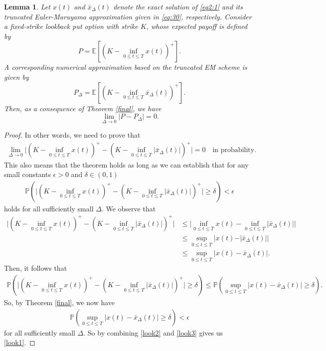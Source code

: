 \documentclass[11pt]{article}
\newtheorem{lemma}[definition]{Lemma}
\begin{document}
\begin{lemma}
Let $x(t)$ and $\bar{x}_{\Delta}(t)$ denote the exact solution of \eqref{eq2:1} and its truncated Euler-Maruyama approximation given in \eqref{eq:30}, respectively. Consider a fixed-strike lookback put option with strike $K$, whose expected payoff is defined by
\begin{equation}\label{eq:52**}
P = \mathbb{E}\left[\left(K - \inf_{0 \le t \le T} x(t)\right)^+\right].
\end{equation}
A corresponding numerical approximation based on the truncated EM scheme is given by
\begin{equation}\label{eq:52***}
P_{\Delta} = \mathbb{E}\left[\left(K - \inf_{0 \le t \le T} \bar{x}_{\Delta}(t)\right)^+\right].
\end{equation}
Then, as a consequence of Theorem \ref{final}, we have
\begin{equation*}
\lim_{\Delta \to 0} |P - P_{\Delta}| = 0.
\end{equation*}
\end{lemma}

\begin{proof}
In other words, we need to prove that
\begin{align*}
\lim_{\Delta\rightarrow 0}\vert  (K-\inf_{0\le t\le T}x(t))^+-(K-\inf_{0\le t\le T}\vert \bar{x}_{\Delta}(t)\vert)^+\vert=0\quad \text{in probability}.
\end{align*}
This also means that the theorem holds as long as we can establish that for any small constants $\epsilon>0$ and $\delta\in (0,1)$
\begin{align}\label{look1}
\mathbb{P}(\vert (K-\inf_{0\le t\le T}x(t))^+-(K-\inf_{0\le t\le T}\vert \bar{x}_{\Delta}(t)\vert)^+\vert\ge \delta)<\epsilon
\end{align}
holds for all sufficiently small $\Delta$. We observe that
\begin{align}
\vert  (K-\inf_{0\le t\le T}x(t))^+-(K-\inf_{0\le t\le T}\vert \bar{x}_{\Delta}(t)\vert)^+\vert
&\le \vert \inf_{0\le t\le T}x(t)-\inf_{0\le t\le T}\vert \bar{x}_{\Delta}(t)\vert\vert\nonumber\\
&\le \sup_{0\le t\le T}\vert x(t)-\vert \bar{x}_{\Delta}(t)\vert\vert\nonumber\\
&\le \sup_{0\le t\le T}\vert x(t)-\bar{x}_{\Delta}(t)\vert.
\end{align}
Then, it follows that 
\begin{align}\label{look2}
\mathbb{P}(\vert (K-\inf_{0\le t\le T}x(t))^+-(K-\inf_{0\le t\le T}\vert \bar{x}_{\Delta}(t)\vert)^+\vert\ge \delta)
\le \mathbb{P}(\sup_{0\le t\le T}\vert x(t)-\bar{x}_{\Delta}(t)\vert\ge \delta).
\end{align}
So, by Theorem \ref{final}, we now have
\begin{align}\label{look3}
\mathbb{P}(\sup_{0\le t\le T}\vert x(t)-\bar{x}_{\Delta}(t)\vert\ge \delta)<\epsilon
\end{align}
for all sufficiently small $\Delta$. So by combining \eqref{look2} and \eqref{look3} gives us \eqref{look1}.
\end{proof}
\end{document}
